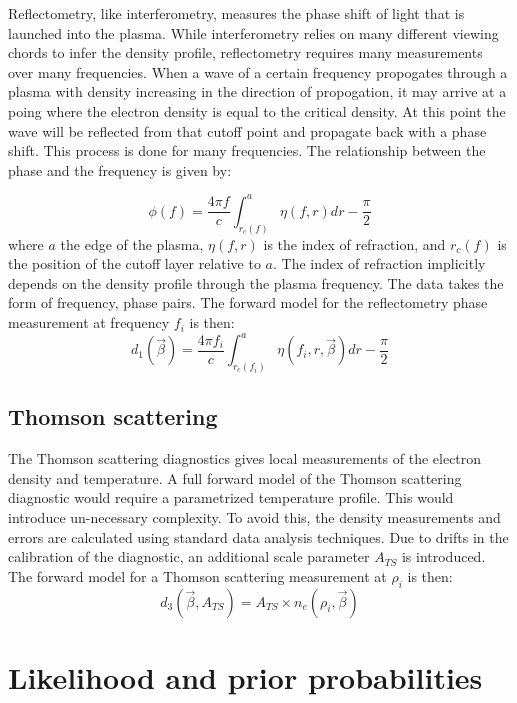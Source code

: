 \documentclass[12pt]{article}
\numberwithin{equation}{section}
\begin{document}
Reflectometry, like interferometry, measures the phase shift of light that is launched into the plasma. While interferometry relies on many different viewing chords to infer the density profile, reflectometry requires many measurements over many frequencies. When a wave of a certain frequency propogates through a plasma with density increasing in the direction of propogation, it may arrive at a poing where the electron density is equal to the critical density. At this point the wave will be reflected from that cutoff point and propagate back with a phase shift. This process is done for many frequencies. The relationship between the phase and the frequency is given by: 

\begin{equation} \label{eq:refl_phase}
\phi(f) = \frac{4\pi f}{c} \int_{r_c(f)}^a \eta(f,r)dr - \frac{\pi}{2}
\end{equation}
where $a$ the edge of the plasma, $\eta(f,r)$ is the index of refraction, and $r_c(f)$ is the position of the cutoff layer relative to $a$. The index of refraction implicitly depends on the density profile through the plasma frequency. The data takes the form of frequency, phase pairs. The forward model for the reflectometry phase measurement at frequency $f_i$ is then:
\begin{equation} \label{eq:refl_model}
	d_1(\vec{\beta})= \frac{4\pi f_i}{c} \int_{r_c(f_i)}^a \eta(f_i,r,\vec{\beta})dr - \frac{\pi}{2}
\end{equation}



\subsection{Thomson scattering}
The Thomson scattering diagnostics gives local measurements of the electron density and temperature. A full forward model of the Thomson scattering diagnostic would require a parametrized temperature profile. This would introduce un-necessary complexity. To avoid this, the density measurements and errors are calculated using standard data analysis techniques. Due to drifts in the calibration of the diagnostic, an additional scale parameter $A_{TS}$ is introduced. The forward model for a Thomson scattering measurement at $\rho_i$ is then:
\begin{equation} \label{eq:thom_model}
	d_3(\vec{\beta},A_{TS}) = A_{TS} \times n_{e}(\rho_i,\vec{\beta})
\end{equation}

\section{Likelihood and prior probabilities}
\end{document}

